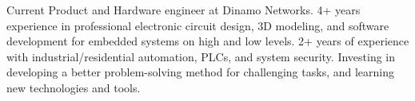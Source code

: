 

\begin{cvparagraph}

Current Product and Hardware engineer at Dinamo Networks. 4+ years experience in professional electronic circuit design, 3D modeling, and software development for embedded systems on high and low levels. 2+ years of experience with industrial/residential automation, PLCs, and system security. Investing in developing a better problem-solving method for challenging tasks, and learning new technologies and tools.
\end{cvparagraph}
